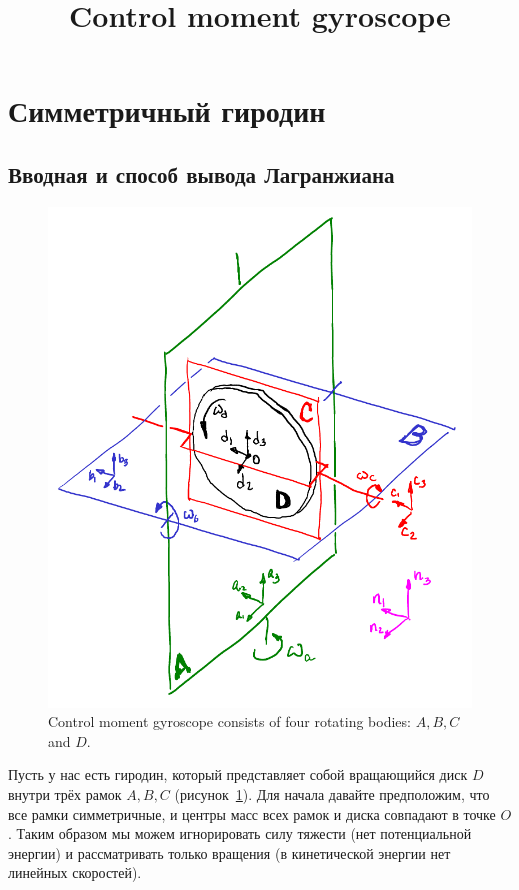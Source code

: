 \documentclass{article}
\title{Control moment gyroscope}
\author{}
\date{}
\begin{document}
\maketitle

\section{Симметричный гиродин}
\subsection{Вводная и способ вывода Лагранжиана}

\begin{figure}[!ht]
\centering
\includegraphics[width=.5\linewidth]{cmg750}
\caption{Control moment gyroscope consists of four rotating bodies: $A, B, C$ and $D$.}
\label{fig:cmg750}
\end{figure}

Пусть у нас есть гиродин, который представляет собой вращающийся диск $D$ внутри трёх рамок $A,B,C$ (рисунок~\ref{fig:cmg750}).
Для начала давайте предположим, что все рамки симметричные, и центры масс всех рамок и диска совпадают в точке $O$.
Таким образом мы можем игнорировать силу тяжести (нет потенциальной энергии) и рассматривать только вращения (в кинетической энергии нет линейных скоростей).
\end{document}
